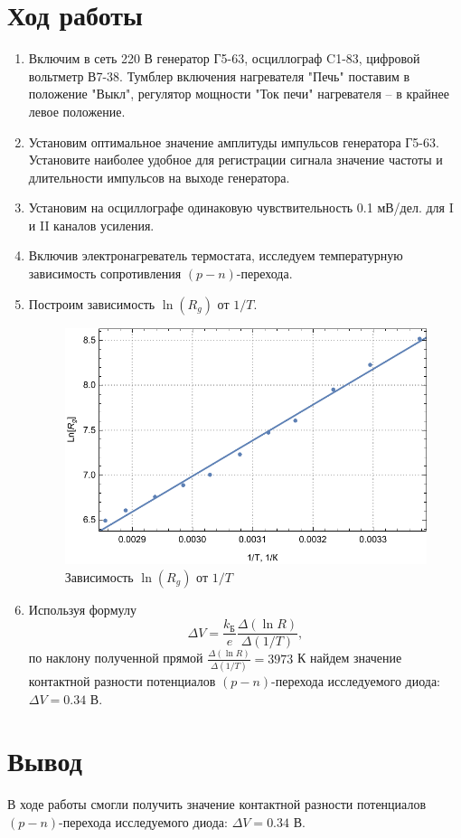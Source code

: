 \documentclass[a4paper, 12pt]{article}
\begin{document}
	\section{Ход работы}
	\begin{enumerate}
		\item Включим в сеть 220 В генератор Г5-63, осциллограф C1-83, цифровой вольтметр В7-38. Тумблер включения нагревателя "Печь" поставим в положение "Выкл", регулятор мощности "Ток печи" нагревателя -- в крайнее левое положение.
		\item Установим оптимальное значение амплитуды импульсов генератора Г5-63. Установите наиболее удобное для регистрации сигнала значение частоты и длительности импульсов на выходе генератора.
		\item Установим на осциллографе одинаковую чувствительность 0.1 мВ/дел. для I и II каналов усиления.
		\item Включив электронагреватель термостата, исследуем температурную зависимость сопротивления $(p-n)$-перехода.
		\item Построим зависимость $\ln{(R_g)}$ от $1/T$.
		\begin{figure}[!htb]
			\centering
			\includegraphics[scale=1]{plot.pdf}
			\caption{Зависимость $\ln{(R_g)}$ от $1/T$}
		\end{figure}
		\item Используя формулу
		\begin{equation*}
			\Delta V=\frac{k_{\text{Б}}}{e}\frac{\Delta(\ln{R})}{\Delta(1/T)},
		\end{equation*}
		по наклону полученной прямой $\frac{\Delta(\ln{R})}{\Delta(1/T)}=3973$ К найдем значение контактной разности потенциалов $(p-n)$-перехода исследуемого диода: $\Delta V=0.34$ В.
	\end{enumerate}
	\section{Вывод}
	В ходе работы смогли получить значение контактной разности потенциалов $(p-n)$-перехода исследуемого диода: $\Delta V=0.34$ В.
\end{document}
